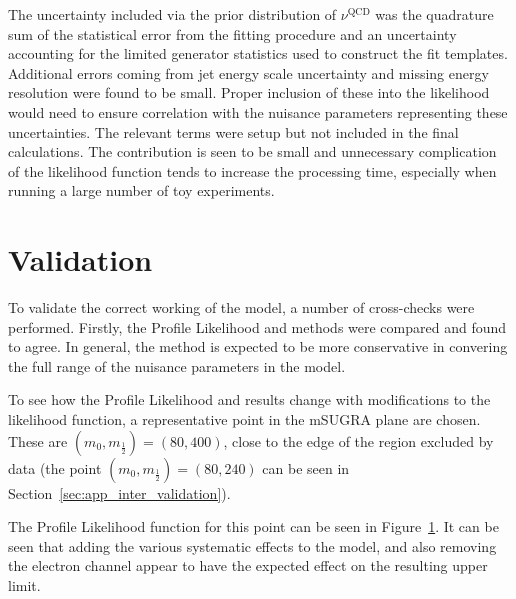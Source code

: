The uncertainty included via the prior distribution of $\nu^{\textrm{QCD}}$ was
the quadrature sum of the statistical error from the fitting procedure and an
uncertainty accounting for the limited generator statistics used to construct
the fit templates. Additional errors coming from jet energy scale uncertainty
and missing energy resolution were found to be small. Proper inclusion of these
into the likelihood would need to ensure correlation with the nuisance
parameters representing these uncertainties. The relevant terms were setup but
not included in the final calculations. The contribution is seen to be small and
unnecessary complication of the likelihood function tends to increase the
processing time, especially when running a large number of toy experiments.

\section{Validation}
To validate the correct working of the model, a number of cross-checks were
performed. Firstly, the Profile Likelihood and \CLs methods were compared and
found to agree. In general, the \CLs method is expected to be more conservative
in convering the full range of the nuisance parameters in the model.

To see how the Profile Likelihood and \CLs results change with modifications to
the likelihood function, a representative point in the \ac{mSUGRA} plane are
chosen. These are $(m_0, m_{\frac{1}{2}}) = (80, 400)$, close to the edge of the
region excluded by data (the point $(m_0, m_{\frac{1}{2}}) = (80, 240)$ can be
seen in Section~\ref{sec:app_inter_validation}).

The Profile Likelihood function for this point can be seen in
Figure~\ref{fig:inter_pl}. It can be seen that adding the various systematic
effects to the model, and also removing the electron channel appear to have the
expected effect on the resulting upper limit.

\begin{figure}[h!]
\centering
{}\quad
{}
\caption[]{}
\label{fig:inter_pl}
\end{figure}

